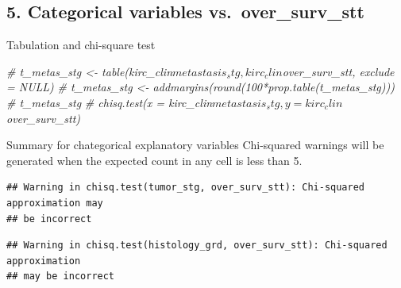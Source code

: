 \documentclass[]{article}
\newenvironment{Shaded}{\begin{snugshade}}{\end{snugshade}}
\newcommand{\KeywordTok}[1]{\textcolor[rgb]{0.13,0.29,0.53}{\textbf{#1}}}
\newcommand{\DataTypeTok}[1]{\textcolor[rgb]{0.13,0.29,0.53}{#1}}
\newcommand{\StringTok}[1]{\textcolor[rgb]{0.31,0.60,0.02}{#1}}
\newcommand{\CommentTok}[1]{\textcolor[rgb]{0.56,0.35,0.01}{\textit{#1}}}
\newcommand{\OtherTok}[1]{\textcolor[rgb]{0.56,0.35,0.01}{#1}}
\newcommand{\OperatorTok}[1]{\textcolor[rgb]{0.81,0.36,0.00}{\textbf{#1}}}
\newcommand{\NormalTok}[1]{#1}
\begin{document}
\subsection{5. Categorical variables
vs.~over\_surv\_stt}\label{categorical-variables-vs.over_surv_stt}

Tabulation and chi-square test

\begin{Shaded}
\begin{Highlighting}[]
\CommentTok{# t_metas_stg <- table(kirc_clin$metastasis_stg, kirc_clin$over_surv_stt, exclude = NULL)}
\CommentTok{# t_metas_stg <- addmargins(round(100*prop.table(t_metas_stg)))}
\CommentTok{# t_metas_stg}
\CommentTok{# chisq.test(x = kirc_clin$metastasis_stg, y = kirc_clin$over_surv_stt) }
\end{Highlighting}
\end{Shaded}

Summary for chategorical explanatory variables Chi-squared warnings will
be generated when the expected count in any cell is less than 5.

\begin{Shaded}
\end{Shaded}

\begin{verbatim}
## Warning in chisq.test(tumor_stg, over_surv_stt): Chi-squared approximation may
## be incorrect
\end{verbatim}

\begin{verbatim}
## Warning in chisq.test(histology_grd, over_surv_stt): Chi-squared approximation
## may be incorrect
\end{verbatim}
\end{document}
